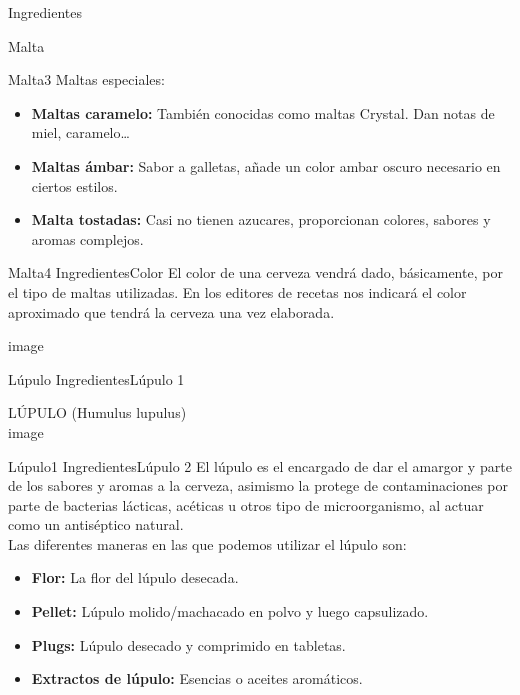 \begin{frame}{Ingredientes}
\begin{block}{Malta}
\begin{block}{Malta3}
Maltas especiales:

\begin{itemize}
\item
  \textbf{Maltas caramelo:} También conocidas como maltas Crystal. Dan
  notas de miel, caramelo\ldots{}
\item
  \textbf{Maltas ámbar:} Sabor a galletas, añade un color ambar oscuro
  necesario en ciertos estilos.
\item
  \textbf{Malta tostadas:} Casi no tienen azucares, proporcionan
  colores, sabores y aromas complejos.
\end{itemize}
\end{block}

\begin{block}{Malta4}
\protect\hypertarget{malta4}{}
IngredientesColor El color de una cerveza vendrá dado, básicamente, por
el tipo de maltas utilizadas. En los editores de recetas nos indicará el
color aproximado que tendrá la cerveza una vez elaborada.

{image}
\end{block}
\end{block}

\begin{block}{Lúpulo}
\protect\hypertarget{luxfapulo}{}
IngredientesLúpulo 1

LÚPULO (Humulus lupulus)\\
{image}

\begin{block}{Lúpulo1}
\protect\hypertarget{luxfapulo1}{}
IngredientesLúpulo 2 El lúpulo es el encargado de dar el amargor y parte
de los sabores y aromas a la cerveza, asimismo la protege de
contaminaciones por parte de bacterias lácticas, acéticas u otros tipo
de microorganismo, al actuar como un antiséptico natural.\\
Las diferentes maneras en las que podemos utilizar el lúpulo son:\\

\begin{itemize}
\item
  \textbf{Flor:} La flor del lúpulo desecada.
\item
  \textbf{Pellet:} Lúpulo molido/machacado en polvo y luego capsulizado.
\item
  \textbf{Plugs:} Lúpulo desecado y comprimido en tabletas.
\item
  \textbf{Extractos de lúpulo:} Esencias o aceites aromáticos.
\end{itemize}


\end{block}
\end{block}
\end{frame}
